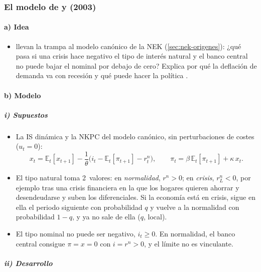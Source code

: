 \documentclass[11pt]{article}
\begin{document}
\subsubsection{El modelo de  y  (2003)}\label{sec:eggertsson-woodford}

\paragraph{a) Idea}

\begin{itemize}
\item \textcite{EggertssonWoodford2003Zero} llevan la trampa al modelo canónico de la NEK (\ref{sec:nek-origenes}): ¿qué pasa si una crisis hace negativo el tipo de interés natural y el banco central no puede bajar el nominal por debajo de cero? Explica por qué la deflación de demanda va con recesión y qué puede hacer la política .
\end{itemize}

\paragraph{b) Modelo}

\subparagraph{i) Supuestos}

\begin{itemize}
\item La IS dinámica y la NKPC del modelo canónico, sin perturbaciones de costes ($u_t=0$):
  \begin{equation*}
  x_t=\mathbb{E}_t[x_{t+1}]-\frac{1}{\theta}\big(i_t-\mathbb{E}_t[\pi_{t+1}]-r^n_t\big),\qquad\pi_t=\beta\,\mathbb{E}_t[\pi_{t+1}]+\kappa\,x_t .
  \end{equation*}
\item El tipo natural toma 2~valores: en \emph{normalidad}, $r^n>0$; en \emph{crisis}, $r^n_L<0$, por ejemplo tras una crisis financiera en la que los hogares quieren ahorrar y desendeudarse y suben los diferenciales. Si la economía está en crisis, sigue en ella el periodo siguiente con probabilidad $q$ y vuelve a la normalidad con probabilidad $1-q$, y ya no sale de ella ($q$, local).
\item El tipo nominal no puede ser negativo, $i_t\geq0$. En normalidad, el banco central consigue $\pi=x=0$ con $i=r^n>0$, y el límite no es vinculante.
\end{itemize}

\subparagraph{ii) Desarrollo}
\end{document}
